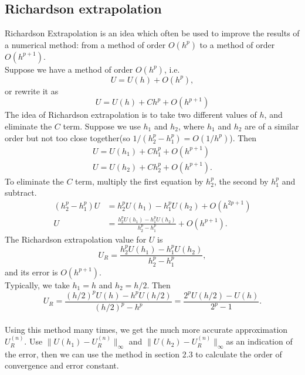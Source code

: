 \documentclass[a4paper,twocolumn]{article}
\theoremstyle{definition}
\begin{document}
\subsection{Richardson extrapolation}
Richardson Extrapolation is an idea which often be used to improve the results of a numerical method: from a method of order $O(h^p)$ to a method of order $O(h^{p+1})$.\\
Suppose we have a method of order $O(h^p)$, i.e.
$$
U=U(h)+O\left(h^{p}\right),
$$
or rewrite it as
$$
U=U(h)+Ch^{p}+O\left(h^{p+1}\right)
$$
The idea of Richardson extrapolation is to take two different values of $h$, and eliminate the $C$ term. Suppose we use $h_1$ and $h_2$, where $h_1$ and $h_2$ are of a similar order but not too close together(so $1 /\left(h_{2}^{p}-h_{1}^{p}\right)=O\left(1 / h^{p}\right)$).
Then
$$
\begin{array}{l}
U=U(h_1)+Ch_1^{p}+O\left(h^{p+1}\right)\\
U=U(h_2)+Ch_2^{p}+O\left(h^{p+1}\right).
\end{array}
$$
To eliminate the $C$ term, multiply the first equation by $h_2^p$, the second by $h_1^p$ and subtract.
$$
\begin{aligned}
\left(h_{2}^{p}-h_{1}^{p}\right) U &=h_{2}^{p} U\left(h_{1}\right)-h_{1}^{p} U\left(h_{2}\right)+O\left(h^{2 p+1}\right) \\
U &=\frac{h_{2}^{p} U\left(h_{1}\right)-h_{1}^{p} U\left(h_{2}\right)}{h_{2}^{p}-h_{1}^{p}}+O\left(h^{p+1}\right).
\end{aligned}
$$
The Richardson extrapolation value for $U$ is
$$
U_{R}=\frac{h_{2}^{p} U\left(h_{1}\right)-h_{1}^{p} U\left(h_{2}\right)}{h_{2}^{p}-h_{1}^{p}},
$$
and its error is $O(h^{p+1})$.\\
Typically, we take $h_1 = h$ and $h_2 = h/2$. Then
$$
U_{R}=\frac{(h / 2)^{p} U(h)-h^{p} U(h / 2)}{(h / 2)^{p}-h^{p}}=\frac{2^{p} U(h / 2)-U(h)}{2^{p}-1}.
$$
\\
Using this method many times, we get the much more accurate approximation $U_R^{(n)}$. Use $\|U(h_1)-U_R^{(n)}\|_{\infty }$ and $\|U(h_2)-U_R^{(n)}\|_{\infty }$as an indication of the error, then we can use the method in section 2.3 to calculate the order of convergence and error constant.
\newpage
\end{document}
